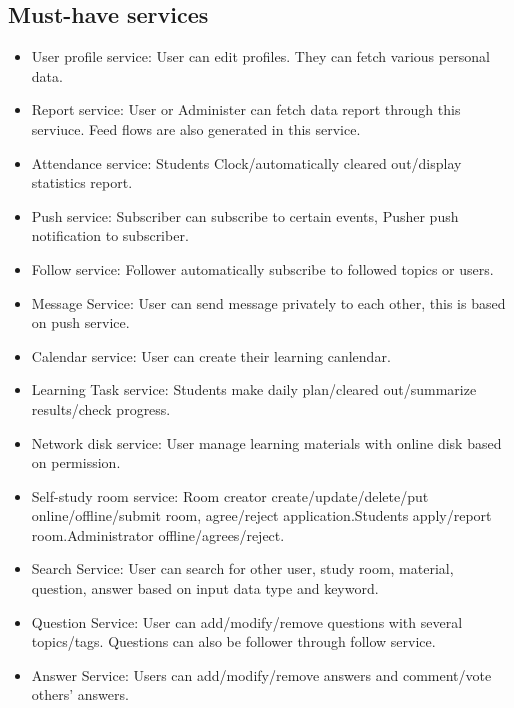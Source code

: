 \documentclass[runningheads]{llncs}
\begin{document}
\subsection*{Must-have services}
\begin{itemize}
    \item User profile service: User can edit profiles. They can fetch various personal data.
    \item Report service: User or Administer can fetch data report through this serviuce. Feed flows are also generated in this service.
    \item Attendance service: Students Clock/automatically cleared out/display statistics report. 
    \item Push service: Subscriber can subscribe to certain events, Pusher push notification to subscriber.
    \item Follow service: Follower automatically subscribe to followed topics or users.
    \item Message Service: User can send message privately to each other, this is based on push service.
    \item Calendar service: User can create their learning canlendar. 
    \item Learning Task service: Students make daily plan/cleared out/summarize results/check progress.
    \item Network disk service: User manage learning materials with online disk based on permission.
    \item Self-study room service: Room creator create/update/delete/put online/offline/submit room, agree/reject application.Students apply/report room.Administrator offline/agrees/reject.
    \item Search Service: User can search for other user, study room, material, question, answer based on input data type and keyword.
    \item Question Service: User can add/modify/remove questions with several topics/tags. Questions can also be follower through follow service.
    \item Answer Service: Users can add/modify/remove answers and comment/vote others' answers.
    
\end{itemize}
\end{document}
